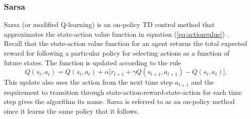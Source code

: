 \subsubsection{Sarsa}
\label{sec:sarsa}
Sarsa (or modified Q-learning) is an on-policy TD control
method that approximates the state-action value function in equation
(\ref{eq:actionvalue}) \cite{rummery:1994}. Recall that the state-action value
function for an agent returns the total expected reward for following a particular policy for
selecting actions as a function of future states.  The function is updated
according to the rule
\begin{equation}
\label{eq:sarsa}
Q(s_t,a_t) = Q(s_t,a_t) + \alpha \bigl[r_{t+1} + \gamma
Q(s_{t+1},a_{t+1}) - Q(s_t,a_t)\bigr].
\end{equation}
This update also uses the action from the next time step $a_{t+1}$ and the
requirement to transition through state-action-reward-state-action for each
time step gives the algorithm its name.  Sarsa is referred to
as an on-policy method since it learns the same policy that it follows.

